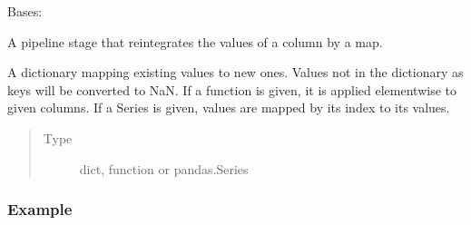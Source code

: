 \documentclass[letterpaper,10pt,english]{sphinxmanual}
\begin{document}
\begin{fulllineitems}
\label{\detokenize{dalio.pipe:dalio.pipe.col_generation.MapColVals}}
Bases: {\hyperref[\detokenize{dalio.pipe:dalio.pipe.col_generation.Custom}]{}}

A pipeline stage that reintegrates the values of a column by a map.

\begin{fulllineitems}
\label{\detokenize{dalio.pipe:dalio.pipe.col_generation.MapColVals.value_map}}
A dictionary mapping
existing values to new ones. Values not in the dictionary as keys
will be converted to NaN. If a function is given, it is applied
element\sphinxhyphen{}wise to given columns. If a Series is given, values are
mapped by its index to its values.
\begin{quote}\begin{description}
\item[{Type}] \leavevmode
dict, function or pandas.Series

\end{description}\end{quote}

\end{fulllineitems}

\subsubsection*{Example}


\end{fulllineitems}
\end{document}
